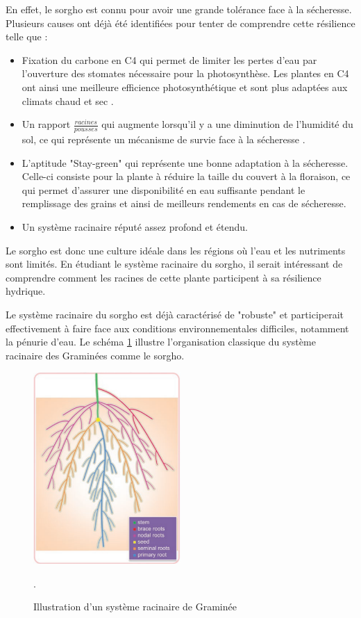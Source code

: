 En effet, le sorgho est connu pour avoir une grande tolérance face à la sécheresse. Plusieurs causes ont déjà été identifiées pour tenter de comprendre cette résilience telle que :
\begin{itemize}
    \item Fixation du carbone en C4 qui permet de limiter les pertes d'eau par l'ouverture des stomates nécessaire pour la photosynthèse. Les plantes en C4 ont ainsi une meilleure efficience photosynthétique et sont plus adaptées aux climats chaud et sec \citep{shanker_c4_2011}.
    \item Un rapport $\frac{racines}{pousses}$ qui augmente lorsqu'il y a une diminution de l'humidité du sol, ce qui représente un mécanisme de survie face à la sécheresse \citep{mwamahonje_drought_2021}.
    \item L'aptitude "Stay-green" qui représente une bonne adaptation à la sécheresse.
    Celle-ci consiste pour la plante à réduire la taille du couvert à la floraison, ce qui permet d'assurer une disponibilité en eau suffisante pendant le remplissage des grains et ainsi de meilleurs rendements en cas de sécheresse.
    \item Un système racinaire réputé assez profond et étendu.
\end{itemize}
Le sorgho est donc une culture idéale dans les régions où l'eau et les nutriments sont limités. 
En étudiant le système racinaire du sorgho, il serait intéressant de comprendre comment les racines de cette plante participent à sa résilience hydrique.
\newline

Le système racinaire du sorgho est déjà caractérisé de "robuste" et participerait effectivement à faire face aux conditions environnementales difficiles, notamment la pénurie d'eau.
Le schéma \ref{fig:RSA} illustre l'organisation classique du système racinaire des Graminées comme le sorgho.

\begin{figure}[ht]
\centering
\includegraphics[width=0.5\textwidth]{Image/RSA.png}
\caption{Illustration d'un système racinaire de Graminée \citep{correa_soil_2019}}.
\label{fig:RSA}
\end{figure}

